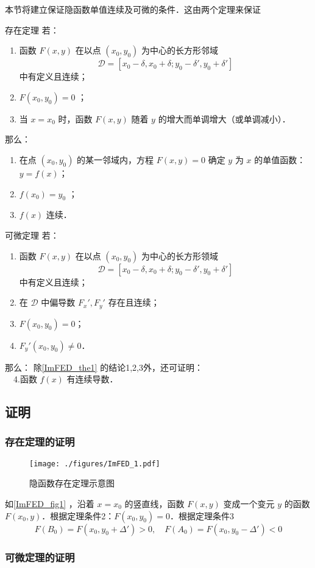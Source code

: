 
本节将建立保证隐函数单值连续及可微的条件．这由两个定理来保证
\begin{theorem}{存在定理}\label{ImFED_the1}
若：\begin{enumerate}
\item 函数 $F(x,y)$ 在以点 $(x_0,y_0)$ 为中心的长方形邻域
\begin{equation}
\mathcal{D}=[x_0-\delta,x_0+\delta;y_0-\delta',y_0+\delta']
\end{equation}
中有定义且连续；
\item $F(x_0,y_0)=0$ ；
\item 当 $x=x_0$ 时，函数 $F(x,y)$ 随着 $y$ 的增大而单调增大（或单调减小）．
\end{enumerate}
那么：
\begin{enumerate}
\item 在点 $(x_0,y_0)$ 的某一邻域内，方程 $F(x,y)=0$ 确定 $y$ 为 $x$ 的单值函数： $y=f(x)$；
\item $f(x_0)=y_0$ ；
\item $f(x)$ 连续．
\end{enumerate}
\end{theorem}

\begin{theorem}{可微定理}
若：
\begin{enumerate}
\item 函数 $F(x,y)$ 在以点 $(x_0,y_0)$ 为中心的长方形领域
\begin{equation}
\mathcal{D}=[x_0-\delta,x_0+\delta;y_0-\delta',y_0+\delta']
\end{equation}
中有定义且连续；
\item 在 $\mathcal{D}$ 中偏导数 $F_x',F_y'$ 存在且连续；
\item $F(x_0,y_0)=0$；
\item $F_y'(x_0,y_0)\neq0$．
\end{enumerate}
那么：
除\autoref{ImFED_the1} 的结论1,2,3外，还可证明：\\
$\quad$4.函数 $f(x)$ 有连续导数．

\end{theorem}
\subsection{证明}
\subsubsection{存在定理的证明}
\begin{figure}[ht]
\centering
\texttt{[image: ./figures/ImFED\_1.pdf]}
\caption{隐函数存在定理示意图} \label{ImFED_fig1}
\end{figure}
如\autoref{ImFED_fig1} ，沿着 $x=x_0$ 的竖直线，函数 $F(x,y)$ 变成一个变元 $y$ 的函数 $F(x_0,y)$．根据定理条件2：$F(x_0,y_0)=0$．根据定理条件3
\begin{equation}
F(B_0)=F(x_0,y_0+\Delta')>0,\quad F(A_0)=F(x_0,y_0-\Delta')<0
\end{equation}


\subsubsection{可微定理的证明}